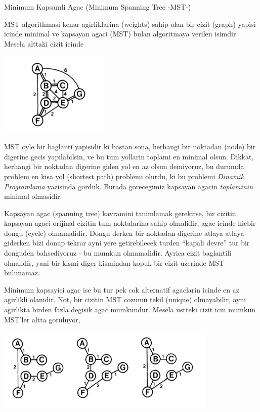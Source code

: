\documentclass[12pt,fleqn]{article}\usepackage{../common}
\begin{document}
Minimum Kapsamli Agac (Minimum Spanning Tree -MST-)

MST algorithmasi kenar agirliklarina (weights) sahip olan bir cizit (graph)
yapisi icinde minimal ve kapsayan agaci (MST) bulan algoritmaya verilen
isimdir. Mesela alttaki cizit icinde

\includegraphics[height=4cm]{minspan_0.png}

MST oyle bir baglanti yapisidir ki bastan sona, herhangi bir noktadan
(node) bir digerine gecis yapilabilsin, ve bu tum yollarin toplami en
minimal olsun. Dikkat, herhangi bir noktadan digerine giden yol en az olsun
demiyoruz, bu durumda problem en kisa yol (shortest path) problemi
olurdu, ki bu problemi {\em Dinamik Programlama} yazisinda gorduk. Burada
gorecegimiz kapsayan agacin {\em toplaminin} minimal olmasidir. 

Kapsayan agac (spanning tree) kavramini tanimlamak gerekirse, bir cizitin
kapsayan agaci orijinal cizitin tum noktalarina sahip olmalidir, agac
icinde hicbir dongu (cycle) olmamalidir. Dongu derken bir noktadan digerine
atlaya atlaya giderken bizi donup tekrar ayni yere getirebilecek turden
``kapali devre'' tur bir donguden bahsediyoruz - bu mumkun
olmamalidir. Ayrica cizit baglantili olmalidir, yani bir kismi diger
kismindan kopuk bir cizit uzerinde MST bulunamaz. 

Minimum kapsayici agac ise bu tur pek cok alternatif agaclarin icinde en az
agirlikli olanidir. Not, bir cizitin MST cozumu tekil (unique) olmayabilir,
ayni agirlikta birden fazla degisik agac mumkundur. Mesela ustteki cizit
icin mumkun MST'ler altta goruluyor,

\includegraphics[height=4cm]{minspan_1.png}
\end{document}
